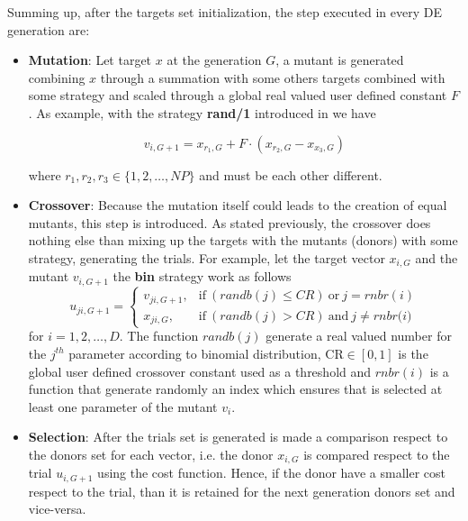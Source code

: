 Summing up, after the targets set initialization, the step executed in every DE generation are:
\begin{itemize}
	\item{\textbf{Mutation}: Let target $x$ at the generation $G$, a mutant is generated combining $x$ through a summation with some others targets combined with some strategy and scaled through a global real valued user defined constant $F$. As example, with the strategy \textbf{rand/1} introduced in \cite{DESEHGOCS:1997} we have
	\begin{center}
		\begin{equation}
			v_{i,G+1} = x_{r_{1},G} + F\cdot(x_{r_{2},G} - x_{x_{3},G})
		\end{equation}
	\end{center}
	where $r_{1},r_{2},r_{3} \in \{1,2,\dots,NP\}$ and must be each other different.}
	\item{\textbf{Crossover}: Because the mutation itself could leads to the creation of equal mutants, this step is introduced. As stated previously, the crossover does nothing else than mixing up the targets with the mutants (donors) with some strategy, generating the trials. For example, let the target vector $x_{i,G}$ and the mutant $v_{i,G+1}$ the \textbf{bin} strategy work as follows
	\begin{equation}
		u_{ji, G+1} = \begin{cases}
			v_{ji,G+1}, & \textrm{if}\ (\textit{randb}(j) \leq \textit{CR})\ \textrm{or}\ j=\textit{rnbr}(i)\\
			x_{ji,G}, & \textrm{if}\ (\textit{randb}(j) > \textit{CR})\ \textrm{and}\ j\neq\textit{rnbr(i)}
		\end{cases}
	\end{equation}
	for $i=1,2,\dots,D$. The function $\textit{randb}(j)$ generate a real valued number for the $j^{th}$ parameter according to binomial distribution, $\textrm{CR}\in[0,1]$ is the global user defined crossover constant used as a threshold and $\textit{rnbr}(i)$ is a function that generate randomly an index which ensures that is selected at least one parameter of the mutant $v_{i}$.}
	\item{\textbf{Selection}: After the trials set is generated is made a comparison respect to the donors set for each vector, i.e. the donor $x_{i, G}$ is compared respect to the trial $u_{i,G+1}$ using the cost function. Hence, if the donor have a smaller cost respect to the trial, than it is retained for the next generation donors set and vice-versa.}
\end{itemize}

